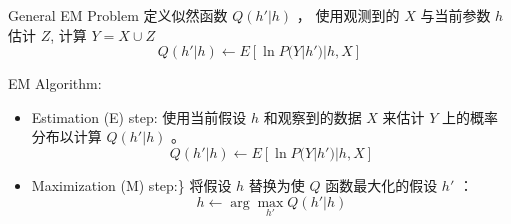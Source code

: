 \documentclass[presentation]{beamer}
\begin{document}
\begin{frame}[label={sec:orgdc6fc7d}]{General  EM Problem}
定义似然函数 \(Q(h' | h)\) ， 使用观测到的 \(X\) 与当前参数 \(h\) 估计 \(Z\), 计算 \(Y = X \cup Z\)
$$Q(h' | h) \leftarrow E[ \ln P(Y | h') | h, X ]$$

EM Algorithm:

\begin{itemize}
\item Estimation (E) step: 
使用当前假设 \(h\) 和观察到的数据 \(X\) 来估计 \(Y\) 上的概率分布以计算 \(Q(h'|h)\) 。
$$Q(h' | h) \leftarrow E[ \ln P(Y | h') | h, X ]$$
\item Maximization (M) step:\} 
将假设 \(h\) 替换为使 \(Q\) 函数最大化的假设 \(h'\) ：
$$h \leftarrow \arg \max_{h'}  Q(h' | h)$$
\end{itemize}
\end{frame}
\end{document}
